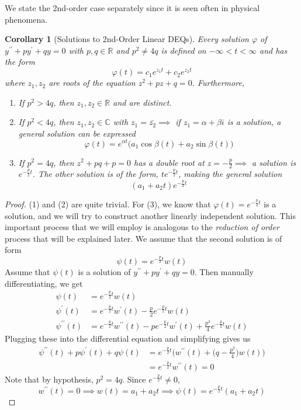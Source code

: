 \documentclass{article}
\newtheorem{corollary}{Corollary}[theorem]
\theoremstyle{remark}
\theoremstyle{definition}
\begin{document}
      We state the 2nd-order case separately since it is seen often in physical phenomena. 

      \begin{corollary}[Solutions to 2nd-Order Linear DEQs]
      Every solution $\varphi$ of $y^{\prime\prime} + py^\prime + q y = 0$ with $p, q \in \mathbb{R}$ and $p^2 \neq 4 q$ is defined on $-\infty < t < \infty$ and has the form 
      \[\varphi(t) = c_1 e^{z_1 t} + c_2 e^{z_2 t}\]
      where $z_1, z_2$ are roots of the equation $z^2 + p z + q = 0$. Furthermore, 
      \begin{enumerate}
          \item If $p^2 > 4q$, then $z_1, z_2 \in \mathbb{R}$ and are distinct. 
          \item If $p^2 < 4q$, then $z_1, z_2 \in \mathbb{C}$ with $z_1 = \bar{z_2} \implies$ if $z_1 = \alpha +\beta i$ is a solution, a general solution can be expressed 
      \[\varphi(t) = e^{\alpha t} \big( a_1 \cos{\beta(t)} + a_2 \sin{\beta(t)}\big)\]
          \item If $p^2 = 4q$, then $z^2 + p q + p = 0$ has a double root at $z = -\frac{p}{2} \implies$ a solution is $e^{- \frac{p}{2} t}$. The other solution is of the form, $t e^{- \frac{p}{2} t}$, making the general solution 
          \[(a_1 + a_2 t) e^{-\frac{p}{2} t}\]
      \end{enumerate}
      \end{corollary}
      \begin{proof}
      (1) and (2) are quite trivial. For (3), we know that $\varphi(t) = e^{-\frac{p}{2} t}$ is a solution, and we will try to construct another linearly independent solution. This important process that we will employ is analogous to the \textit{reduction of order} process that will be explained later. We assume that the second solution is of form
      \[\psi (t) = e^{-\frac{p}{2} t} w (t)\]
      Assume that $\psi (t)$ is a solution of $y^{\prime\prime} + p y^\prime + q y = 0$. Then manually differentiating, we get 
      \begin{align*}
          \psi (t) & = e^{-\frac{p}{2}t} w(t) \\
          \psi^\prime (t) & = e^{-\frac{p}{2} t} w^\prime (t) - \frac{p}{2} e^{-\frac{p}{2} t} w(t) \\
          \psi^{\prime\prime} (t) & = e^{-\frac{p}{2} t} w^{\prime \prime} (t) - p e^{-\frac{p}{2} t} w^\prime (t) + \frac{p^3}{4} e^{-\frac{p}{2} t} w(t) 
      \end{align*}
      Plugging these into the differential equation and simplifying gives us
      \begin{align*}
          \psi^{\prime\prime} (t) + p \psi^\prime (t) + q \psi (t) & = e^{-\frac{p}{2} t} \bigg( w^{\prime\prime} (t) + \Big( q - \frac{p^2}{4} \Big) w(t) \bigg) \\
          & = e^{-\frac{p}{2} t} w^{\prime\prime} (t) = 0
      \end{align*}
      Note that by hypothesis, $p^2 = 4q$. Since $e^{-\frac{p}{2} t} \neq 0$, 
      \[w^{\prime\prime} (t) = 0 \implies w (t) = a_1 + a_2 t \implies \psi(t) = e^{-\frac{p}{2} t} (a_1 + a_2 t)\]
      \end{proof}
\end{document}
